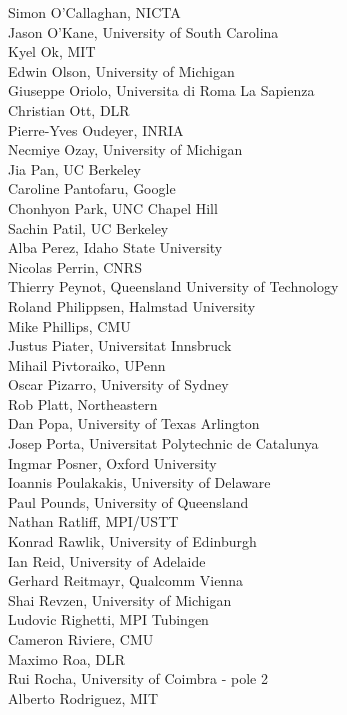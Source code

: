 \begin{multicols}{3}
{Simon O'Callaghan, NICTA\\
Jason O'Kane, University of South Carolina\\
Kyel Ok, MIT\\
Edwin Olson, University of Michigan\\
Giuseppe Oriolo, Universita di Roma La Sapienza\\
Christian Ott, DLR\\
Pierre-Yves Oudeyer, INRIA\\
Necmiye Ozay, University of Michigan\\
Jia Pan, UC Berkeley\\
Caroline Pantofaru, Google\\
Chonhyon Park, UNC Chapel Hill\\
Sachin Patil, UC Berkeley\\
Alba Perez, Idaho State University\\
Nicolas Perrin, CNRS\\
Thierry Peynot, Queensland University of Technology\\
Roland Philippsen, Halmstad University\\
Mike Phillips, CMU\\
Justus Piater, Universitat Innsbruck\\
Mihail Pivtoraiko, UPenn\\
Oscar Pizarro, University of Sydney\\
Rob Platt, Northeastern\\
Dan Popa, University of Texas Arlington\\
Josep Porta, Universitat Polytechnic de Catalunya\\
Ingmar Posner, Oxford University\\
Ioannis Poulakakis, University of Delaware\\
Paul Pounds, University of Queensland\\
Nathan Ratliff, MPI/USTT\\
Konrad Rawlik, University of Edinburgh\\
Ian Reid, University of Adelaide\\
Gerhard Reitmayr, Qualcomm Vienna\\
Shai Revzen, University of Michigan\\
Ludovic Righetti, MPI Tubingen\\
Cameron Riviere, CMU\\
Maximo Roa, DLR\\
Rui Rocha, University of Coimbra - pole 2\\
Alberto Rodriguez, MIT\\
}
\end{multicols}
